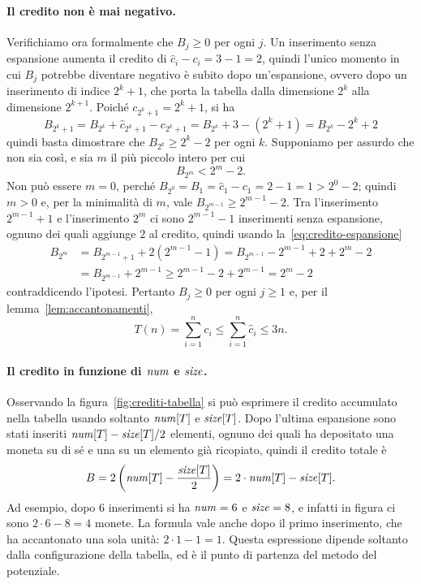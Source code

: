 \paragraph{Il credito non è mai negativo.}
Verifichiamo ora formalmente che $B_j \ge 0$ per ogni $j$. Un inserimento senza espansione aumenta il credito di $\hat{c}_i - c_i = 3 - 1 = 2$, quindi l'unico momento in cui $B_j$ potrebbe diventare negativo è subito dopo un'espansione, ovvero dopo un inserimento di indice $2^k + 1$, che porta la tabella dalla dimensione $2^k$ alla dimensione $2^{k+1}$. Poiché $c_{2^k+1} = 2^k + 1$, si ha
\begin{equation}\label{eq:credito-espansione}
B_{2^k+1} = B_{2^k} + \hat{c}_{2^k+1} - c_{2^k+1} = B_{2^k} + 3 - (2^k + 1) = B_{2^k} - 2^k + 2
\end{equation}
quindi basta dimostrare che $B_{2^k} \ge 2^k - 2$ per ogni $k$. Supponiamo per assurdo che non sia così, e sia $m$ il più piccolo intero per cui
\[
B_{2^m} < 2^m - 2.
\]
Non può essere $m = 0$, perché $B_{2^0} = B_1 = \hat{c}_1 - c_1 = 2 - 1 = 1 > 2^0 - 2$; quindi $m > 0$ e, per la minimalità di $m$, vale $B_{2^{m-1}} \ge 2^{m-1} - 2$. Tra l'inserimento $2^{m-1}+1$ e l'inserimento $2^m$ ci sono $2^{m-1}-1$ inserimenti senza espansione, ognuno dei quali aggiunge $2$ al credito, quindi usando la~\eqref{eq:credito-espansione}
\[
\begin{aligned}
B_{2^m} &= B_{2^{m-1}+1} + 2\left(2^{m-1} - 1\right) = B_{2^{m-1}} - 2^{m-1} + 2 + 2^m - 2 \\
&= B_{2^{m-1}} + 2^{m-1} \ge 2^{m-1} - 2 + 2^{m-1} = 2^m - 2
\end{aligned}
\]
contraddicendo l'ipotesi. Pertanto $B_j \ge 0$ per ogni $j \ge 1$ e, per il lemma~\ref{lem:accantonamenti},
\[
T(n) = \sum_{i=1}^{n} c_i \le \sum_{i=1}^{n} \hat{c}_i \le 3n.
\]

\paragraph{Il credito in funzione di $\mathit{num}$ e $\mathit{size}$.}
Osservando la figura~\ref{fig:crediti-tabella} si può esprimere il credito accumulato nella tabella usando soltanto $\mathit{num}[T]$ e $\mathit{size}[T]$. Dopo l'ultima espansione sono stati inseriti $\mathit{num}[T] - \mathit{size}[T]/2$ elementi, ognuno dei quali ha depositato una moneta su di sé e una su un elemento già ricopiato, quindi il credito totale è
\[
B = 2\left(\mathit{num}[T] - \frac{\mathit{size}[T]}{2}\right) = 2\cdot\mathit{num}[T] - \mathit{size}[T].
\]
Ad esempio, dopo $6$ inserimenti si ha $\mathit{num} = 6$ e $\mathit{size} = 8$, e infatti in figura ci sono $2\cdot 6 - 8 = 4$ monete. La formula vale anche dopo il primo inserimento, che ha accantonato una sola unità: $2\cdot 1 - 1 = 1$. Questa espressione dipende soltanto dalla configurazione della tabella, ed è il punto di partenza del metodo del potenziale.

